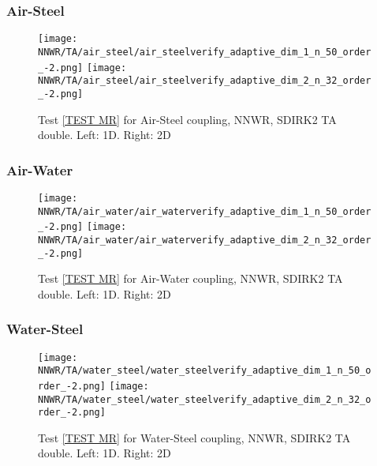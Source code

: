 \documentclass[a4paper,10pt]{article}
\begin{document}
\FloatBarrier
\subsubsection{Air-Steel}\label{SEC NNWR TA DOUBLE AIR STEEL}
% 

\begin{figure}[!ht]
\texttt{[image: NNWR/TA/air\_steel/air\_steelverify\_adaptive\_dim\_1\_n\_50\_order\_-2.png]}
\texttt{[image: NNWR/TA/air\_steel/air\_steelverify\_adaptive\_dim\_2\_n\_32\_order\_-2.png]}
\caption{Test \ref{TEST MR} for Air-Steel coupling, NNWR, SDIRK2 TA double. Left: 1D. Right: 2D}
\label{FIG NNWR SDIRK2 TA DOUBLE AIR STEEL}
\end{figure}

\FloatBarrier
\subsubsection{Air-Water}\label{SEC NNWR TA DOUBLE AIR WATER}
% 

\begin{figure}[!ht]
\texttt{[image: NNWR/TA/air\_water/air\_waterverify\_adaptive\_dim\_1\_n\_50\_order\_-2.png]}
\texttt{[image: NNWR/TA/air\_water/air\_waterverify\_adaptive\_dim\_2\_n\_32\_order\_-2.png]}
\caption{Test \ref{TEST MR} for Air-Water coupling, NNWR, SDIRK2 TA double. Left: 1D. Right: 2D}
\label{FIG NNWR SDIRK2 TA DOUBLE AIR WATER}
\end{figure}

\FloatBarrier
\subsubsection{Water-Steel}\label{SEC NNWR TA DOUBLE WATER STEEL}
% 

\begin{figure}[!ht]
\texttt{[image: NNWR/TA/water\_steel/water\_steelverify\_adaptive\_dim\_1\_n\_50\_order\_-2.png]}
\texttt{[image: NNWR/TA/water\_steel/water\_steelverify\_adaptive\_dim\_2\_n\_32\_order\_-2.png]}
\caption{Test \ref{TEST MR} for Water-Steel coupling, NNWR, SDIRK2 TA double. Left: 1D. Right: 2D}
\label{FIG NNWR SDIRK2 TA DOUBLE WATER STEEL}
\end{figure}
\end{document}
